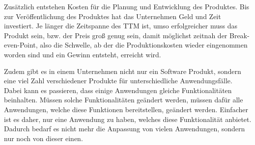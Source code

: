 Zusätzlich entstehen Kosten für die Planung und Entwicklung des Produktes. Bis zur Veröffentlichung des Produktes hat das Unternehmen Geld und Zeit investiert. Je länger die Zeitspanne des TTM ist, umso erfolgreicher muss das Produkt sein, bzw. der Preis groß genug sein, damit möglichst zeitnah der Break-even-Point, also die Schwelle, ab der die Produktionskosten wieder eingenommen worden sind und ein Gewinn entsteht, erreicht wird.

Zudem gibt es in einem Unternehmen nicht nur ein Software Produkt, sondern eine viel Zahl verschiedener Produkte für unterschiedliche Anwendungsfälle. Dabei kann es passieren, dass einige Anwendungen gleiche Funktionalitäten beinhalten. Müssen solche Funktionalitäten geändert werden, müssen dafür alle Anwendungen, welche diese Funktionen bereitstellen, geändert werden. Einfacher ist es daher, nur eine Anwendung zu haben, welches diese Funktionalität anbietet. Dadurch bedarf es nicht mehr die Anpassung von vielen Anwendungen, sondern nur noch von dieser einen.

